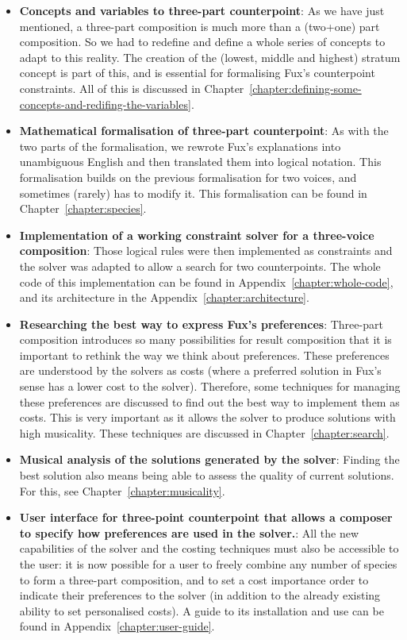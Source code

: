 \begin{itemize}
    \item \textbf{Concepts and variables to three-part counterpoint}:
    As we have just mentioned, a three-part composition is much more than a (two+one) part composition. So we had to redefine and define a whole series of concepts to adapt to this reality. The creation of the (lowest, middle and highest) stratum concept is part of this, and is essential for formalising Fux's counterpoint constraints. All of this is discussed in Chapter~\ref{chapter:defining-some-concepts-and-redifing-the-variables}.
    \item \textbf{Mathematical formalisation of three-part counterpoint}: As with the two parts of the formalisation, we rewrote Fux's explanations into unambiguous English and then translated them into logical notation. This formalisation builds on the previous formalisation for two voices, and sometimes (rarely) has to modify it. This formalisation can be found in Chapter~\ref{chapter:species}.
    \item \textbf{Implementation of a working constraint solver for a three-voice composition}: Those logical rules were then implemented as constraints and the solver was adapted to allow a search for two counterpoints. The whole code of this implementation can be found in Appendix~\ref{chapter:whole-code}, and its architecture in the Appendix~\ref{chapter:architecture}.
    \item \textbf{Researching the best way to express Fux's preferences}: Three-part composition introduces so many possibilities for result composition that it is important to rethink the way we think about preferences. These preferences are understood by the solvers as costs (where a preferred solution in Fux's sense has a lower cost to the solver). Therefore, some techniques for managing these preferences are discussed to find out the best way to implement them as costs. This is very important as it allows the solver to produce solutions with high musicality. These techniques are discussed in Chapter~\ref{chapter:search}.
    \item \textbf{Musical analysis of the solutions generated by the solver}: Finding the best solution also means being able to assess the quality of current solutions. For this, see Chapter~\ref{chapter:musicality}. 
    \item \textbf{User interface for three-point counterpoint that allows a composer to specify how preferences are used in the solver.}: All the new capabilities of the solver and the costing techniques must also be accessible to the user: it is now possible for a user to freely combine any number of species to form a three-part composition, and to set a cost importance order to indicate their preferences to the solver (in addition to the already existing ability to set personalised costs). A guide to its installation and use can be found in Appendix~\ref{chapter:user-guide}.
\end{itemize}


